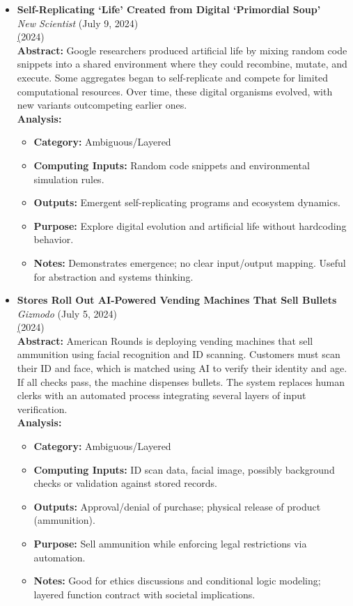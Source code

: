 \documentclass[11pt]{article}
\begin{document}
\begin{itemize}
\item \textbf{Self-Replicating ‘Life’ Created from Digital ‘Primordial Soup’} \\
\textit{New Scientist} (July 9, 2024)\\
\href{https://technews.acm.org/archives.cfm?fo=2024-07-jul#27} (2024)\\
\textbf{Abstract:} Google researchers produced artificial life by mixing random code snippets into a shared environment where they could recombine, mutate, and execute. Some aggregates began to self-replicate and compete for limited computational resources. Over time, these digital organisms evolved, with new variants outcompeting earlier ones.\\
\textbf{Analysis:}\\
\begin{itemize}
\item \textbf{Category:} Ambiguous/Layered
\item \textbf{Computing Inputs:} Random code snippets and environmental simulation rules.
\item \textbf{Outputs:} Emergent self-replicating programs and ecosystem dynamics.
\item \textbf{Purpose:} Explore digital evolution and artificial life without hardcoding behavior.
\item \textbf{Notes:} Demonstrates emergence; no clear input/output mapping. Useful for abstraction and systems thinking.
\end{itemize}

\item \textbf{Stores Roll Out AI-Powered Vending Machines That Sell Bullets} \\
\textit{Gizmodo} (July 5, 2024)\\
\href{https://technews.acm.org/archives.cfm?fo=2024-07-jul#29} (2024)\\
\textbf{Abstract:} American Rounds is deploying vending machines that sell ammunition using facial recognition and ID scanning. Customers must scan their ID and face, which is matched using AI to verify their identity and age. If all checks pass, the machine dispenses bullets. The system replaces human clerks with an automated process integrating several layers of input verification.\\
\textbf{Analysis:}\\
\begin{itemize}
\item \textbf{Category:} Ambiguous/Layered
\item \textbf{Computing Inputs:} ID scan data, facial image, possibly background checks or validation against stored records.
\item \textbf{Outputs:} Approval/denial of purchase; physical release of product (ammunition).
\item \textbf{Purpose:} Sell ammunition while enforcing legal restrictions via automation.
\item \textbf{Notes:} Good for ethics discussions and conditional logic modeling; layered function contract with societal implications.
\end{itemize}


\end{itemize}
\end{document}
